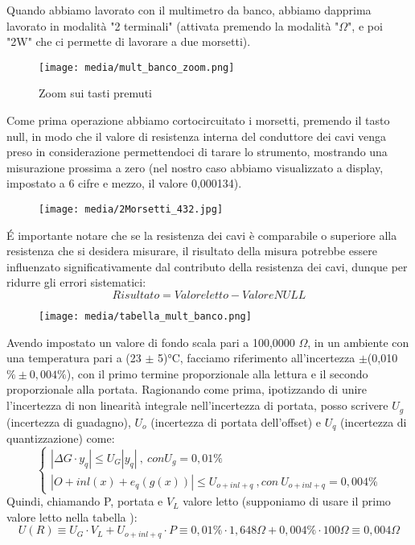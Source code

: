 Quando abbiamo lavorato con il multimetro da banco, abbiamo dapprima lavorato in modalità "2 terminali" (attivata premendo la modalità "$\Omega$", e poi "2W" che ci permette di lavorare a due morsetti).

\begin{figure}[h]
    \centering
    \texttt{[image: media/mult\_banco\_zoom.png]}
    \caption{Zoom sui tasti premuti}
    \label{fig:mult_banco_zoom}
\end{figure}

Come prima operazione abbiamo cortocircuitato i morsetti, premendo il tasto null, in modo che il valore di resistenza interna del conduttore dei cavi venga preso in considerazione permettendoci di tarare lo strumento, mostrando una misurazione prossima a zero (nel nostro caso abbiamo visualizzato a display, impostato a 6 cifre e mezzo, il valore 0,000134).


\begin{figure}[h]
    \centering
    \texttt{[image: media/2Morsetti\_432.jpg]}
    \label{fig:2morsetti}
\end{figure}

\'E importante notare che se la resistenza dei cavi è comparabile o superiore alla resistenza che si desidera misurare, il risultato della misura potrebbe essere influenzato significativamente dal contributo della resistenza dei cavi, dunque per ridurre gli errori sistematici:
\begin{equation}
    Risultato = Valore letto - Valore NULL
\end{equation}

\begin{figure}[h]
    \centering
    \texttt{[image: media/tabella\_mult\_banco.png]}
    \label{fig:tab_mult_banco}
\end{figure}

Avendo impostato un valore di fondo scala pari a 100,0000 $\Omega$, in un ambiente con una temperatura pari a (23 $\pm$ 5)°C, facciamo riferimento all'incertezza $\pm$(0,010 $\% \pm 0,004 \%$), con il primo termine proporzionale alla lettura e il secondo proporzionale alla portata.
Ragionando come prima, ipotizzando di unire l'incertezza di non linearità integrale nell'incertezza di portata, posso scrivere $U_g$ (incertezza di guadagno), $U_o$ (incertezza di portata dell'offset) e $U_q$ (incertezza di quantizzazione) come: 
\begin{equation}
    \left\{ \begin{array}{rcl}
| \Delta G \cdot y_q | \leq U_G |y_q| \ , \ con U_g=0,01\%
\\ | O + inl(x) + e_q(g(x)) | \leq U_{o+inl+q} \ , con \ U_{o+inl+q}=0,004\%
\end{array}\right.
\end{equation}
Quindi, chiamando P, portata e $V_L$ valore letto (supponiamo di usare il primo valore letto nella tabella \label{mult_port}):
\begin{equation}
    U(R) \equiv U_G \cdot V_L + U_{o+inl+q} \cdot P \equiv 0,01\% \cdot 1,648\Omega + 0,004 \% \cdot 100 \Omega \equiv 0,004 \Omega 
\end{equation}

